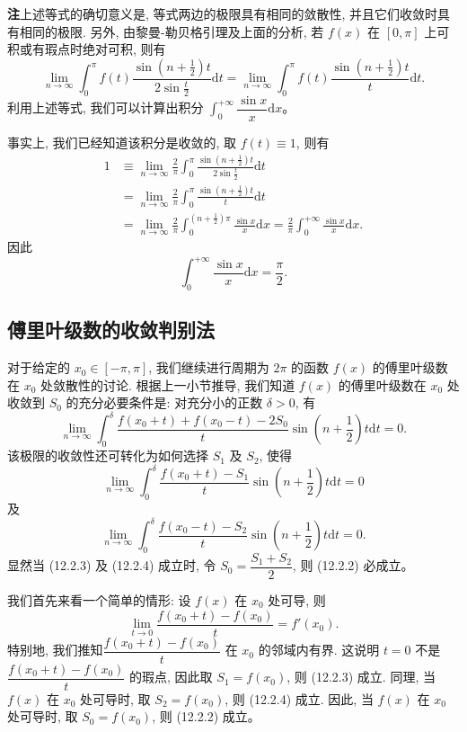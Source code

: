 \documentclass[UTF8,12pt,a4paper,fontset=fandol]{ctexart}
\begin{document}
\noindent\textbf{注}\quad 上述等式的确切意义是, 等式两边的极限具有相同的敛散性, 并且它们收敛时具有相同的极限. 另外, 由黎曼-勒贝格引理及上面的分析, 若 $f(x)$ 在 $[0,\pi]$ 上可积或有瑕点时绝对可积, 则有
\[
  \lim_{n\to\infty}\int_0^\pi f(t)\frac{\sin\left(n+\frac12\right)t}{2\sin\frac t2}\mathrm dt
  =
  \lim_{n\to\infty}\int_0^\pi f(t)\frac{\sin\left(n+\frac12\right)t}{t}\mathrm dt.
\]
利用上述等式, 我们可以计算出积分 $\int_0^{+\infty}\dfrac{\sin x}{x}\mathrm dx$。

事实上, 我们已经知道该积分是收敛的, 取 $f(t)\equiv1$, 则有
\[
\begin{aligned}
  1
  &\equiv\lim_{n\to\infty}\frac2\pi\int_0^\pi
    \frac{\sin\left(n+\frac12\right)t}{2\sin\frac t2}\mathrm dt\\
  &=\lim_{n\to\infty}\frac2\pi\int_0^\pi
    \frac{\sin\left(n+\frac12\right)t}{t}\mathrm dt\\
  &=\lim_{n\to\infty}\frac2\pi\int_0^{(n+\frac12)\pi}\frac{\sin x}{x}\mathrm dx
  =\frac2\pi\int_0^{+\infty}\frac{\sin x}{x}\mathrm dx.
\end{aligned}
\]
因此
\[
  \int_0^{+\infty}\frac{\sin x}{x}\mathrm dx=\frac{\pi}{2}.
\]

\subsection{傅里叶级数的收敛判别法}

对于给定的 $x_0\in[-\pi,\pi]$, 我们继续进行周期为 $2\pi$ 的函数 $f(x)$ 的傅里叶级数在 $x_0$ 处敛散性的讨论. 根据上一小节推导, 我们知道 $f(x)$ 的傅里叶级数在 $x_0$ 处收敛到 $S_0$ 的充分必要条件是: 对充分小的正数 $\delta>0$, 有
\begin{equation}
  \lim_{n\to\infty}\int_0^\delta
  \frac{f(x_0+t)+f(x_0-t)-2S_0}{t}
  \sin\left(n+\frac12\right)t\mathrm dt=0.
  \tag{12.2.2}
\end{equation}
该极限的收敛性还可转化为如何选择 $S_1$ 及 $S_2$, 使得
\begin{equation}
  \lim_{n\to\infty}\int_0^\delta
  \frac{f(x_0+t)-S_1}{t}\sin\left(n+\frac12\right)t\mathrm dt=0
  \tag{12.2.3}
\end{equation}
及
\begin{equation}
  \lim_{n\to\infty}\int_0^\delta
  \frac{f(x_0-t)-S_2}{t}\sin\left(n+\frac12\right)t\mathrm dt=0.
  \tag{12.2.4}
\end{equation}
显然当 (12.2.3) 及 (12.2.4) 成立时, 令 $S_0=\dfrac{S_1+S_2}{2}$, 则 (12.2.2) 必成立。

我们首先来看一个简单的情形: 设 $f(x)$ 在 $x_0$ 处可导, 则
\[
  \lim_{t\to0}\frac{f(x_0+t)-f(x_0)}{t}=f'(x_0).
\]
特别地, 我们推知\allowbreak $\dfrac{f(x_0+t)-f(x_0)}{t}$ 在 $x_0$ 的邻域内有界. 这说明 $t=0$ 不是 $\dfrac{f(x_0+t)-f(x_0)}{t}$ 的瑕点, 因此取 $S_1=f(x_0)$, 则 (12.2.3) 成立. 同理, 当 $f(x)$ 在 $x_0$ 处可导时, 取 $S_2=f(x_0)$, 则 (12.2.4) 成立. 因此, 当 $f(x)$ 在 $x_0$ 处可导时, 取 $S_0=f(x_0)$, 则 (12.2.2) 成立。
\end{document}
